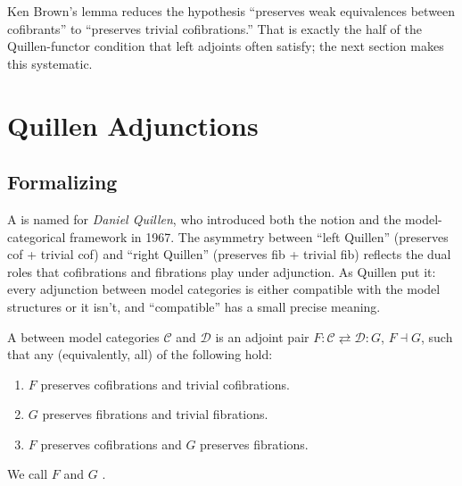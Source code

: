 \begin{remark}
Ken Brown's lemma reduces the hypothesis ``preserves weak equivalences
between cofibrants'' to ``preserves trivial cofibrations.'' That is exactly
the half of the Quillen-functor condition that left adjoints often
satisfy; the next section makes this systematic.
\end{remark}


\section{Quillen Adjunctions}
\label{sec:quillen-adjunctions}

\subsection{Formalizing}

\begin{nameorigin}
A  is named for \emph{Daniel Quillen}, who
introduced both the notion and the model-categorical framework in 1967.
The asymmetry between ``left Quillen'' (preserves cof + trivial cof) and
``right Quillen'' (preserves fib + trivial fib) reflects the dual roles
that cofibrations and fibrations play under adjunction. As Quillen put
it: every adjunction between model categories is either compatible with
the model structures or it isn't, and ``compatible'' has a small
precise meaning.
\end{nameorigin}

\begin{definition}
\label{def:quillen-adjunction}
A  between model categories $\mathcal{C}$ and
$\mathcal{D}$ is an adjoint pair $F : \mathcal{C} \rightleftarrows
\mathcal{D} : G$, $F \dashv G$, such that any (equivalently, all) of the
following hold:
\begin{enumerate}
  \item $F$ preserves cofibrations and trivial cofibrations.
  \item $G$ preserves fibrations and trivial fibrations.
  \item $F$ preserves cofibrations and $G$ preserves fibrations.
\end{enumerate}
We call $F$  and $G$ .
\end{definition}

